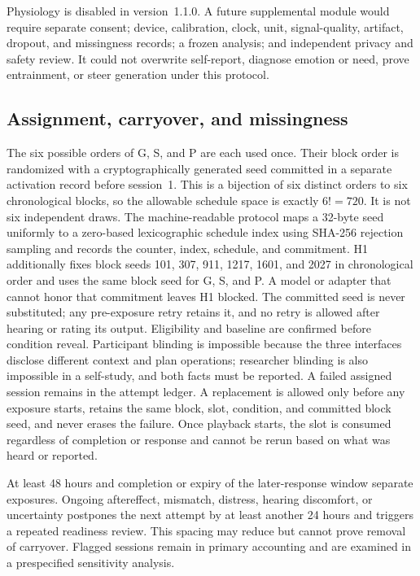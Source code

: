 Physiology is disabled in version~1.1.0. A future supplemental module would
require separate consent; device, calibration, clock, unit, signal-quality,
artifact, dropout, and missingness records; a frozen analysis; and independent
privacy and safety review. It could not overwrite self-report, diagnose emotion
or need, prove entrainment, or steer generation under this protocol.


\subsection{Assignment, carryover, and missingness}
\label{sec:methods-assignment-missingness}

The six possible orders of G, S, and P are each used once. Their block order is
randomized with a cryptographically generated seed committed in a separate
activation record before session~1. This is a bijection of six distinct orders
to six chronological blocks, so the allowable schedule space is exactly
$6!=720$. It is not six independent draws. The machine-readable protocol maps
a 32-byte seed uniformly to a zero-based lexicographic schedule index using
SHA-256 rejection sampling and records the counter, index, schedule, and
commitment. H1 additionally fixes block seeds
101, 307, 911, 1217, 1601, and 2027 in chronological order and uses the same
block seed for G, S, and P. A model or adapter that cannot honor that commitment
leaves H1 blocked. The committed seed is never substituted; any pre-exposure
retry retains it, and no retry is allowed after hearing or rating its output.
Eligibility and baseline are confirmed before condition
reveal. Participant blinding is impossible because the three interfaces
disclose different context and plan operations; researcher blinding is also
impossible in a self-study, and both facts must be reported. A failed assigned
session remains in the attempt ledger. A replacement is allowed only before any
exposure starts, retains the same block, slot, condition, and committed block
seed, and never erases the failure. Once playback starts, the slot is consumed
regardless of completion or response and cannot be rerun based on what was heard
or reported.

At least 48 hours and completion or expiry of the later-response window separate
exposures. Ongoing aftereffect, mismatch, distress, hearing discomfort, or
uncertainty postpones the next attempt by at least another 24 hours and triggers
a repeated readiness review. This spacing may reduce but cannot prove removal
of carryover. Flagged sessions remain in primary accounting and are examined in
a prespecified sensitivity analysis.

